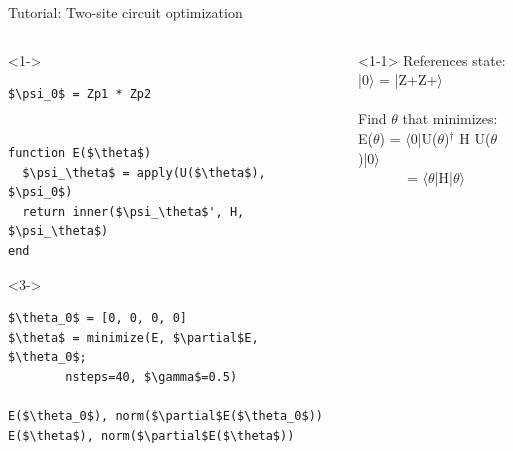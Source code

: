 \begin{frame}[fragile]{Tutorial: Two-site circuit optimization}

\begin{columns}

\begin{column}{5cm}

\begin{onlyenv}<1->
\begin{lstlisting}[language=JuliaLocal, style=julia, mathescape, basicstyle=\small]
$\psi_0$ = Zp1 * Zp2


function E($\theta$)
  $\psi_\theta$ = apply(U($\theta$), $\psi_0$)
  return inner($\psi_\theta$', H, $\psi_\theta$)
end
\end{lstlisting}
\end{onlyenv}

\begin{onlyenv}<3->
\begin{lstlisting}[language=JuliaLocal, style=julia, mathescape, basicstyle=\small]
$\theta_0$ = [0, 0, 0, 0]
$\theta$ = minimize(E, $\partial$E, $\theta_0$;
        nsteps=40, $\gamma$=0.5)

E($\theta_0$), norm($\partial$E($\theta_0$))
E($\theta$), norm($\partial$E($\theta$))
 \end{lstlisting}
\end{onlyenv}

\end{column}

\begin{column}{5cm}

\begin{onlyenv}<1-1>
References state: \\
|0$\rangle$ = |Z+Z+$\rangle$ \\
~\\
Find $\theta$ that minimizes: \\
E($\theta$) = $\langle$0|U($\theta$)$^\dagger$ H U($\theta$)|0$\rangle$ \\
\ \ \ \ \ \ \ = $\langle\theta$|H|$\theta\rangle$ \\
~\\
\end{onlyenv}


\end{column}
\end{columns}
\end{frame}
